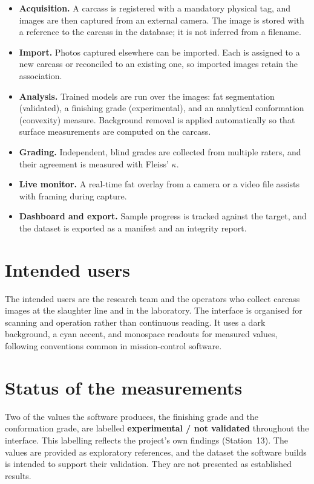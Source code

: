 \begin{itemize}[leftmargin=1.3em,itemsep=3pt]
  \item \textbf{Acquisition.} A carcass is registered with a mandatory physical
        tag, and images are then captured from an external camera. The image is
        stored with a reference to the carcass in the database; it is not inferred
        from a filename.
  \item \textbf{Import.} Photos captured elsewhere can be imported. Each is
        assigned to a new carcass or reconciled to an existing one, so imported
        images retain the association.
  \item \textbf{Analysis.} Trained models are run over the images: fat
        segmentation (validated), a finishing grade (experimental), and an
        analytical conformation (convexity) measure. Background removal is applied
        automatically so that surface measurements are computed on the carcass.
  \item \textbf{Grading.} Independent, blind grades are collected from multiple
        raters, and their agreement is measured with Fleiss' $\kappa$.
  \item \textbf{Live monitor.} A real-time fat overlay from a camera or a video
        file assists with framing during capture.
  \item \textbf{Dashboard and export.} Sample progress is tracked against the
        target, and the dataset is exported as a manifest and an integrity report.
\end{itemize}

\section{Intended users}

The intended users are the research team and the operators who collect carcass
images at the slaughter line and in the laboratory. The interface is organised for
scanning and operation rather than continuous reading. It uses a dark background,
a cyan accent, and monospace readouts for measured values, following conventions
common in mission-control software.

\section{Status of the measurements}

Two of the values the software produces, the finishing grade and the conformation
grade, are labelled \textbf{experimental / not validated} throughout the
interface. This labelling reflects the project's own findings (Station~13). The
values are provided as exploratory references, and the dataset the software builds
is intended to support their validation. They are not presented as established
results.
